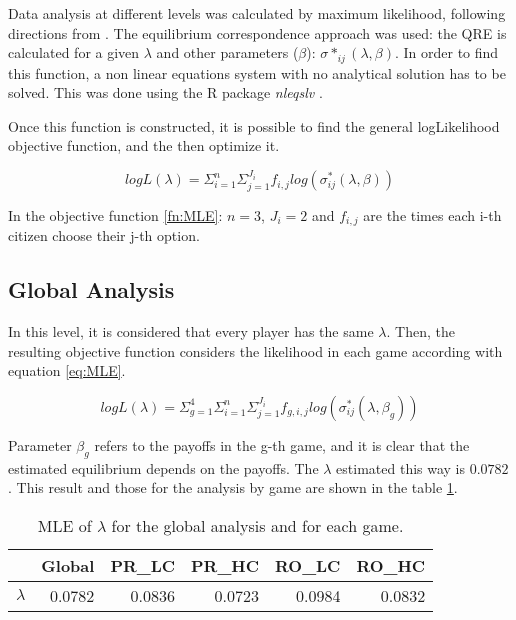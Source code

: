 Data analysis at different levels was calculated by maximum likelihood, following directions from . 
The equilibrium correspondence approach was used: the QRE is calculated for a given $\lambda$ and other parameters ($\beta$): $\sigma*_{ij}(\lambda, \beta)$. In order to find this function, a non linear equations system with no analytical solution has to be solved. 
This was done using the R package \emph{nleqslv} \cite{Hasselman2011}.

Once this function is constructed, it is possible to find the general logLikelihood objective function, and the then optimize it.

\begin{equation}
	logL(\lambda) = 
	\Sigma^n_{i=1} \Sigma^{J_i}_{j=1} f_{i,j} log(\sigma^*_{ij}(\lambda, \beta))
\end{equation}\label{fn:MLE}

In the objective function \ref{fn:MLE}: $n=3$, $J_i = 2$ and $f_{i,j}$ are the times each i-th citizen choose their j-th option.

\subsection{Global Analysis}
In this level, it is considered that every player has the same $\lambda$. Then, the resulting objective function considers the likelihood in each game according with equation \ref{eq:MLE}.

\begin{equation} \label{eq:MLE}
	logL(\lambda) = 
	\Sigma^4_{g=1} \Sigma^n_{i=1} \Sigma^{J_i}_{j=1} f_{g,i,j} log(\sigma^*_{ij}(\lambda, \beta_g))
\end{equation}

Parameter $\beta_g$ refers to the payoffs in the g-th game, and it is clear that the estimated equilibrium depends on the payoffs. The $\lambda$ estimated this way is $ 0.0782$. This result and those for the analysis by game are shown in the table \ref{mle_lambda}.

\begin{table}[ht]
	\centering
	\begin{tabular}{rrrrrr}
		\hline
		& Global & PR\_LC & PR\_HC & RO\_LC & RO\_HC \\ 
		\hline
		$\lambda$ & 0.0782 & 0.0836 & 0.0723 & 0.0984 & 0.0832 \\ 
		\hline
	\end{tabular}\caption[MLE: global and by game]{MLE of $\lambda$ for the global analysis and for each game.}\label{mle_lambda}
\end{table}


